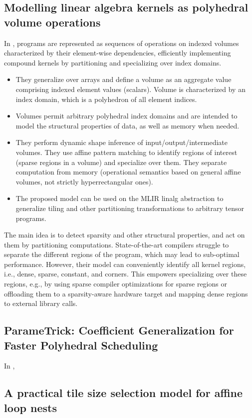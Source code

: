 \documentclass[a4paper, 11pt]{article}
\begin{document}
\subsection{Modelling linear algebra kernels as polyhedral volume operations}
In \cite{friebel2022modelling}, programs are represented as sequences of operations on indexed volumes characterized by their element-wise dependencies, efficiently implementing compound kernels by partitioning and specializing over index domains.
\begin{itemize}
    \item They generalize over arrays and define a volume as an aggregate value comprising indexed element values (scalars). Volume is characterized by an index domain, which is a polyhedron of all element indices.
    \item Volumes permit arbitrary polyhedral index domains and are intended to model the structural properties of data, as well as memory when needed.
    \item They perform dynamic shape inference of input/output/intermediate volumes. They use affine pattern matching to identify regions of interest (sparse regions in a volume) and specialize over them. They separate computation from memory (operational semantics based on general affine volumes, not strictly hyperrectangular ones).
    \item The proposed model can be used on the MLIR linalg abstraction to generalize tiling and other partitioning transformations to arbitrary tensor programs.
\end{itemize}
The main idea is to detect sparsity and other structural properties, and act on them by partitioning computations. State-of-the-art compilers struggle to separate the different regions of the program, which may lead to sub-optimal performance. However, their model can conveniently identify all kernel regions, i.e., dense, sparse, constant, and corners. This empowers specializing over these regions, e.g., by using sparse compiler optimizations for sparse regions or offloading them to a sparsity-aware hardware target and mapping dense regions to external library calls.

\subsection{ParameTrick: Coefficient Generalization for Faster Polyhedral Scheduling}
In \cite{consolaro24-parametrick}, 

\subsection{A practical tile size selection model for affine loop nests}
\end{document}
